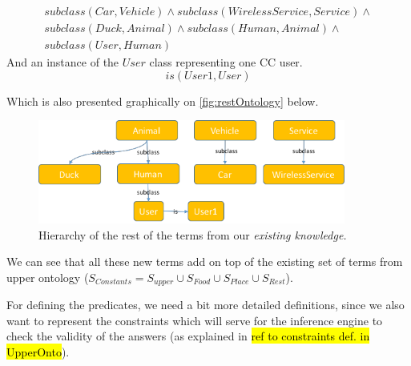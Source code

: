 \begin{equation}\label{as:kbPlaceSubclasses}
\begin{gathered}
    subclass(Car,Vehicle) \land subclass(WirelessService,Service)\land\\
	subclass(Duck,Animal)\land subclass(Human,Animal)\land \\
	subclass(User,Human)
\end{gathered}
\end{equation}
And an instance of the $User$ class representing one CC user.
\begin{equation}
	is(User1,User)
\end{equation}

Which is also presented graphically on \autoref{fig:restOntology} below.
\begin{figure}[H]
	\centering
		\includegraphics[width=0.9\textwidth]{figures/restOntology.png}
	\caption{Hierarchy of the rest of the terms from our \emph{existing 
	knowledge.}}
	\label{fig:restOntology}
\end{figure}
We can see that all these new terms add on top of the existing set of terms from 
upper ontology ($S_{Constants} = S_{upper} \cup S_{Food} \cup S_{Place} 
\cup S_{Rest}$). 

For defining the predicates, we need a bit more detailed definitions, since we 
also want to represent the constraints which will serve for the inference 
engine to check the validity of the answers (as explained in 
\hl{ref to constraints def. in UpperOnto}).

